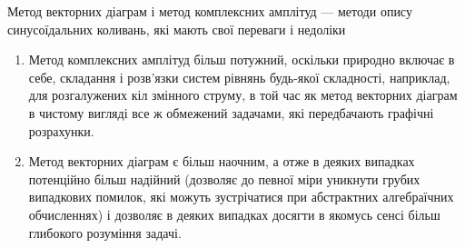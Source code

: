 \begin{More}

	Метод векторних діаграм і метод комплексних амплітуд --- методи опису синусоїдальних коливань, які мають свої переваги і недоліки
	\begin{enumerate}[label=$\checkmark$]
		\item Метод комплексних амплітуд більш потужний, оскільки природно включає в себе, складання і розв'язки систем рівнянь будь-якої складності, наприклад, для розгалужених кіл змінного струму, в той час як метод векторних діаграм в чистому вигляді все ж обмежений задачами, які передбачають графічні розрахунки.
		\item Метод векторних діаграм є більш наочним, а отже в деяких випадках потенційно більш надійний (дозволяє до певної міри уникнути грубих випадкових помилок, які можуть зустрічатися при абстрактних алгебраїчних обчисленнях) і дозволяє в деяких випадках досягти в якомусь сенсі більш глибокого розуміння задачі.
	\end{enumerate}
\end{More}




